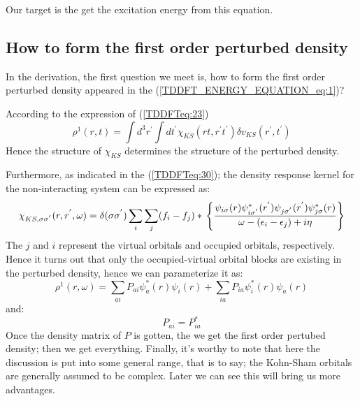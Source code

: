 Our target is the get the excitation energy from this equation.

\subsection{How to form the first order perturbed density}
%
%
%
%
In the derivation, the first question we meet is, how to form the
first order perturbed density appeared in the
(\ref{TDDFT_ENERGY_EQUATION_eq:1})?

According to the expression of (\ref{TDDFTeq:23})
\begin{equation}\label{TDDFT_ENERGY_EQUATION_eq:2}
\rho^{1}(r,t) = \int d^{3}r^{'}\int dt^{'}
\chi_{KS}(rt,r^{'}t^{'})\delta v_{KS}(r^{'},t^{'})
\end{equation}
Hence the structure of $\chi_{KS}$ determines the structure of the
perturbed density.

Furthermore, as indicated in the (\ref{TDDFTeq:30}); the density
response kernel for the non-interacting system can be expressed as:
\begin{equation}\label{TDDFT_ENERGY_EQUATION_eq:3}
\chi_{KS,\sigma\sigma^{'}}(r,r^{'}, \omega) =\delta(\sigma\sigma^{'})
\sum_{i}\sum_{j}(f_{i} - f_{j})* \\
\left\{\frac{\psi_{i\sigma}(r)\psi_{i\sigma^{'}}^{*}(r^{'})
\psi_{j\sigma^{'}}(r^{'})\psi_{j\sigma}^{*}(r)} {\omega -
(\epsilon_{i} - \epsilon_{j}) + i\eta} \right\}
\end{equation}
The $j$ and $i$ represent the virtual orbitals and occupied orbitals,
respectively. Hence it turns out that only the occupied-virtual
orbital blocks are existing in the perturbed density, hence we can
parameterize it as:
\begin{equation}
 \label{TDDFT_ENERGY_EQUATION_eq:4}
\rho^{1}(r,\omega) = \sum_{ai}P_{ai}\psi^{*}_{a}(r)\psi_{i}(r) +
\sum_{ia}P_{ia}\psi^{*}_{i}(r)\psi_{a}(r)
\end{equation}
and:
\begin{equation}
P_{ai} = P_{ia}^{*}
\end{equation}
Once the density matrix of $P$ is gotten, the we get the first order
pertubed density; then we get everything. Finally, it's worthy to
note that here the discussion is put into some general range, that is
to say; the Kohn-Sham orbitals are generally assumed to be complex.
Later we can see this will bring us more advantages.

